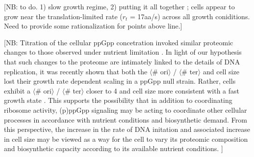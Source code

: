 [NB: to do. 1) slow growth regime, 2) putting it all together ; cells appear to
grow near the translation-limited rate ($r_t$ = 17aa/s) across all growth coniditions. Need
to provide some rationalization for points above line.]

[NB: Titration of the cellular ppGpp concetration invoked similar proteomic changes
to those observed under nutrient limitation \citep{zhu2019}. In light of our
hypothesis that such changes to the proteome are intimately linked to  the
details of DNA replication, it was recently shown that both the  $\langle$\#
ori$\rangle$ / $\langle$\# ter$\rangle$ and cell size lost their growth rate
dependent scaling in a ppGpp null strain. Rather, cells exhibit a $\langle$\#
ori$\rangle$ / $\langle$\# ter$\rangle$ closer to 4 and cell size more
consistent with a fast growth state \citep{fernandezcoll2020}. This supports the
possibility that in addition  to coordinating ribosome activity, (p)ppGpp
signaling may be acting to coordinate other  cellular processes in accordance
with nutrient conditions and biosynthetic demand. From this  perspective, the
increase in the rate of DNA initation and associated increase in cell  size may
be viewed as a way for the cell to vary its proteomic composition and
biosynthetic  capacity according to its available nutrient conditions. ]





